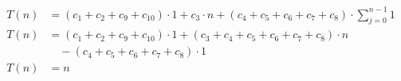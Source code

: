 \begin{subequations}
\begin{align}
\label{eq:findlinesegments1}
T(n)& = (c_{1} + c_{2} + c_{9} + c_{10}) \cdot 1 + c_{3} \cdot n + (c_{4} + c_{5} + c_{6} + c_{7} + c_{8}) \cdot
 \sum_{j=0}^{n-1} 1\\
\label{eq:findlinesegments2}
T(n)& = (c_{1} + c_{2} + c_{9} + c_{10}) \cdot 1 + (c_{3} + c_{4} + c_{5} + c_{6} + c_{7} + c_{8}) \cdot n\\
& \quad - (c_{4} + c_{5} + c_{6} + c_{7} + c_{8}) \cdot 1 \nonumber \\
\label{eq:findlinesegments3}
T(n)& = n
\end{align}
\end{subequations}
